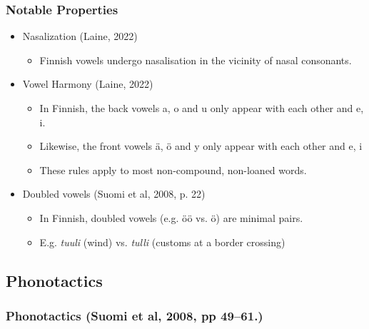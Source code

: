 \documentclass{beamer}
\begin{document}
\begin{frame}
	\frametitle{Notable Properties}
	\begin{itemize}
		\item Nasalization (Laine, 2022)
			\begin{itemize}
				\item Finnish vowels undergo nasalisation in the vicinity of nasal consonants.
			\end{itemize}
		\item Vowel Harmony (Laine, 2022)
			\begin{itemize}
				\item In Finnish, the back vowels a, o and u only appear with each other and e, i.
				\item Likewise, the front vowels \"a, \"o and y only appear with each other and e, i 
				\item These rules apply to most non-compound, non-loaned words.
			\end{itemize}
		\item Doubled vowels (Suomi et al, 2008, p. 22)
			\begin{itemize}
				\item In Finnish, doubled vowels (e.g. \"o\"o vs. \"o) are minimal pairs.
				\item E.g. \emph{tuuli} (wind) vs. \emph{tulli} (customs at a border crossing)
			\end{itemize}
	\end{itemize}
\end{frame}

\subsection{Phonotactics}

\begin{frame}
	\frametitle{Phonotactics (Suomi et al, 2008, pp 49--61.)}
	\begin{center}
	\end{center}
	
\end{frame}
\end{document}
